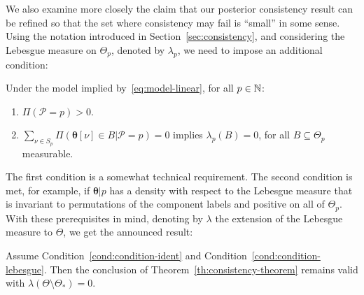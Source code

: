 We also examine more closely the claim that our posterior consistency result can be refined so that the set where consistency may fail is ``small'' in some sense. Using the notation introduced in Section~\ref{sec:consistency}, and considering the Lebesgue measure on \(\Theta_p\), denoted by \(\lambda_p\), we need to impose an additional condition:

\begin{condition} Under the model implied by~\eqref{eq:model-linear}, for all \(p\in\mathbb{N}\):\label{cond:condition-lebesgue}
  \begin{enumerate}[label=(\roman*)]
    \item \(\Pi(\mathcal P = p) > 0\).\label{cond:condition-lebesgue-1}
    \item \(\sum_{\nu\in S_p} \Pi(\bm \theta[\nu] \in B|\mathcal P = p) = 0\) implies \(\lambda_p(B)=0\), for all \(B\subseteq \Theta_p\) measurable.\label{cond:condition-lebesgue-2}
  \end{enumerate}
\end{condition}

The first condition is a somewhat technical requirement. The second condition is met, for example, if \(\bm \theta|p\) has a density with respect to the Lebesgue measure that is invariant to permutations of the component labels and positive on all of \(\Theta_p\). With these prerequisites in mind, denoting by \(\lambda\) the extension of the Lebesgue measure to \(\Theta\), we get the announced result:

\begin{proposition}\label{th:consistency-theorem-2}
  Assume Condition~\ref{cond:condition-ident} and Condition~\ref{cond:condition-lebesgue}. Then the conclusion of Theorem~\ref{th:consistency-theorem} remains valid with \(\lambda(\Theta \setminus \Theta_*)=0\).
\end{proposition}

